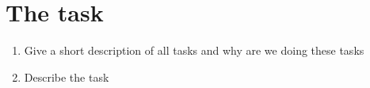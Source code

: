 \section{The task}\label{sec:task}
\begin{enumerate}[i]
	\item Give a short description of all tasks and why are we doing these tasks
	\item Describe the task
\end{enumerate}